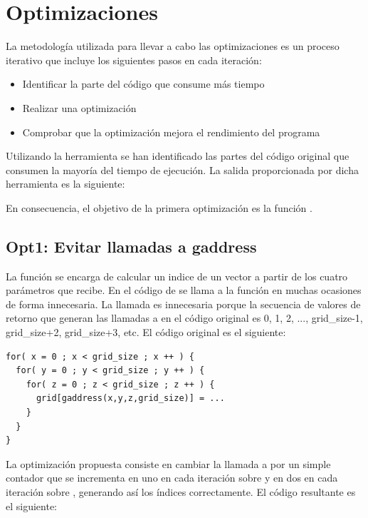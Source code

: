 \section{Optimizaciones}

La metodolog\'{i}a utilizada para llevar a cabo las optimizaciones es un
proceso iterativo que incluye los siguientes pasos en cada iteraci\'{o}n:

\begin{itemize}
\item Identificar la parte del c\'{o}digo que consume m\'{a}s tiempo
\item Realizar una optimizaci\'{o}n
\item Comprobar que la optimizaci\'{o}n mejora el rendimiento del programa
\end{itemize}

Utilizando la herramienta  se han identificado las partes del
c\'{o}digo original que consumen la mayor\'{i}a del tiempo de ejecuci\'{o}n.
La salida proporcionada por dicha herramienta es la siguiente:


En consecuencia, el objetivo de la primera optimizaci\'{o}n es la funci\'{o}n
.

\subsection{Opt1: Evitar llamadas a gaddress}

La funci\'{o}n  se encarga de calcular un indice de un
vector a partir de los cuatro par\'{a}metros que recibe. En el c\'{o}digo de
 se llama a la funci\'{o}n  en
muchas ocasiones de forma innecesaria. La llamada es innecesaria porque la
secuencia de valores de retorno que generan las llamadas a 
en el c\'{o}digo original es 0, 1, 2, ..., grid\_size-1, grid\_size+2,
grid\_size+3, etc. El c\'{o}digo original es el siguiente:

\begin{verbatim}
for( x = 0 ; x < grid_size ; x ++ ) {
  for( y = 0 ; y < grid_size ; y ++ ) {
    for( z = 0 ; z < grid_size ; z ++ ) {
      grid[gaddress(x,y,z,grid_size)] = ...
    }
  }
}
\end{verbatim}

La optimizaci\'{o}n propuesta consiste en cambiar la llamada a
 por un simple contador que se incrementa en uno en cada
iteraci\'{o}n sobre  y en dos en cada iteraci\'{o}n sobre
, generando as\'{i} los \'{i}ndices correctamente. El c\'{o}digo
resultante es el siguiente:

